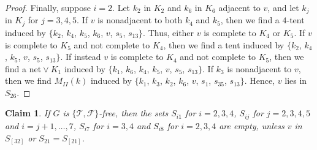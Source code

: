 \documentclass[12pt]{book}
\theoremstyle{plain}
\newtheorem{claim}[teo]{Claim}
\theoremstyle{remark}
\begin{document}
\begin{proof}
	Finally, suppose $i=2$. Let $k_2$ in $K_2$ and $k_6$ in $K_6$ adjacent to $v$, and let $k_j$ in $K_j$ for $j=3,4,5$. If $v$ is nonadjacent to both $k_4$ and $k_5$, then we find a $4$-tent induced by $\{ k_2$, $k_4$, $k_5$, $k_6$, $v$, $s_5$, $s_{13} \}$. Thus, either $v$ is complete to $K_4$ or $K_5$. If $v$ is complete to $K_5$ and not complete to $K_4$, then we find a tent induced by $\{ k_2$, $k_4$, $k_5$, $v$, $s_5$, $s_{13} \}$. If instead $v$ is complete to $K_4$ and not complete to $K_5$, then we find a net${}\vee K_1$ induced by $\{ k_1$, $k_6$, $k_4$, $k_5$, $v$, $s_5$, $s_{13} \}$.
	If $k_3$ is nonadjacent to $v$, then we find $M_{II}(k)$ induced by $\{ k_1$, $k_3$, $k_2$, $k_6$, $v$, $s_1$, $s_{35}$, $s_{13} \}$. Hence, $v$ lies in $S_{26}$.
\end{proof}

\begin{claim} \label{claim:co4tent_6} 
	If $G$ is $\{ \mathcal{T}, \mathcal{F} \}$-free, then the sets $S_{i1}$ for $i=2, 3, 4$, $S_{ij}$ for $j=2, 3, 4, 5$ and $i=j+1, \ldots, 7$, $S_{i7}$ for $i= 3,4$ and $S_{i8}$ for $i= 2,3,4$ are empty, unless $v$ in $S_{[32]}$ or $S_{21}=S_{[21]}$. 
\end{claim} 
\end{document}
